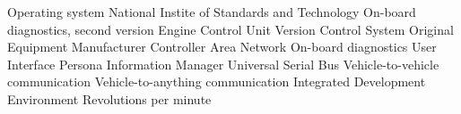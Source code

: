 		{Operating system}
		{National Instite of Standards and Technology}
		{On-board diagnostics, second version}
		{Engine Control Unit}
		{Version Control System}
		{Original Equipment Manufacturer}
		{Controller Area Network}
		{On-board diagnostics}
		{User Interface}
		{Persona Information Manager}
		{Universal Serial Bus}
		{Vehicle-to-vehicle communication}
		{Vehicle-to-anything communication}
		{Integrated Development Environment}
		{Revolutions per minute}